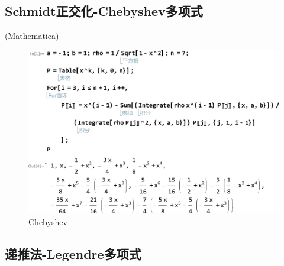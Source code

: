 \subsection{Schmidt正交化-Chebyshev多项式}

\qa (Mathematica)
\begin{figure}[H]
	\centering
	\includegraphics[width = 0.8\linewidth]{day6/fig2.png}
	\caption{Chebyshev}
\end{figure}
\subsection{递推法-Legendre多项式}

